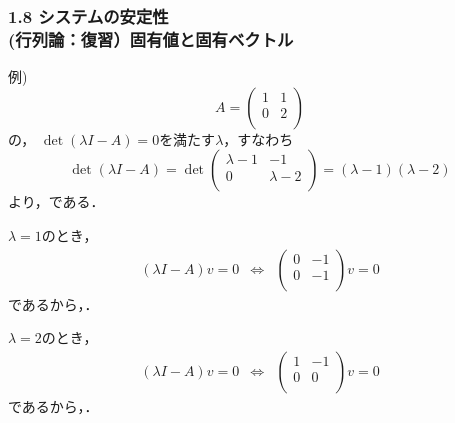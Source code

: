 \begin{frame}[t]
\frametitle{1.8 システムの安定性 \\
 (行列論：復習）固有値と固有ベクトル}
例)
\begin{equation}
 A = \left(
      \begin{array}{cc}
       1 & 1 \\
       0 & 2 \\
      \end{array}
     \right)
\end{equation}
の，
$\det(\lambda I - A) = 0$を満たす$\lambda$，すなわち
\begin{equation}
 \det(\lambda I - A) =
 \det
 \left(
 \begin{array}{cc}
  \lambda - 1 & -1 \\
  0           & \lambda - 2 \\
 \end{array}
 \right) =
 (\lambda - 1)(\lambda - 2)
\end{equation}
より，である．

$\lambda = 1$のとき，
\begin{equation}
 \begin{array}{ccc}
 (\lambda I - A) v = 0
 &\Leftrightarrow&
 \left(
 \begin{array}{cc}
  0 & -1 \\
  0 & -1 \\
 \end{array}
 \right) v = 0
 \end{array}
\end{equation}
であるから，．

$\lambda = 2$のとき，
\begin{equation}
 \begin{array}{ccc}
 (\lambda I - A) v = 0
 &\Leftrightarrow&
 \left(
 \begin{array}{cc}
  1 & -1 \\
  0 & 0 \\
 \end{array}
 \right) v = 0
 \end{array}
\end{equation}
であるから，．
\end{frame}


